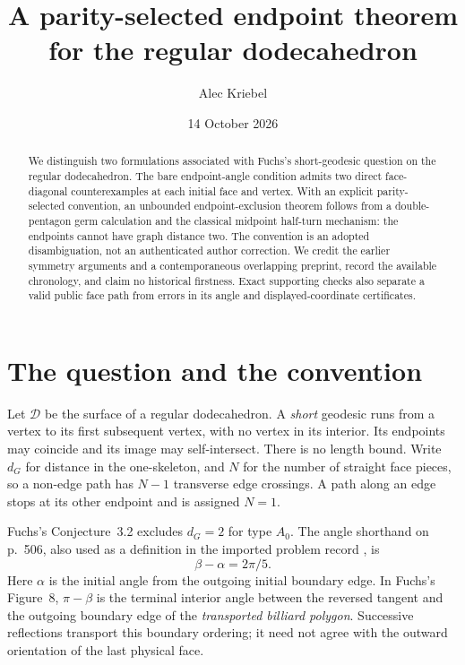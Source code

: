 \documentclass[11pt]{amsart}
\title[A dodecahedral endpoint theorem]{A parity-selected endpoint theorem for the regular dodecahedron}
\author{Alec Kriebel}
\date{14 October 2026}
\theoremstyle{remark}
\newcommand{\D}{\mathcal D}
\begin{document}
\begin{abstract}
We distinguish two formulations associated with Fuchs's short-geodesic question on the regular dodecahedron. The bare endpoint-angle condition admits two direct face-diagonal counterexamples at each initial face and vertex. With an explicit parity-selected convention, an unbounded endpoint-exclusion theorem follows from a double-pentagon germ calculation and the classical midpoint half-turn mechanism: the endpoints cannot have graph distance two. The convention is an adopted disambiguation, not an authenticated author correction. We credit the earlier symmetry arguments and a contemporaneous overlapping preprint, record the available chronology, and claim no historical firstness. Exact supporting checks also separate a valid public face path from errors in its angle and displayed-coordinate certificates.
\end{abstract}
\maketitle

\section{The question and the convention}
Let $\D$ be the surface of a regular dodecahedron. A \emph{short} geodesic runs from a vertex to its first subsequent vertex, with no vertex in its interior. Its endpoints may coincide and its image may self-intersect. There is no length bound. Write $d_G$ for distance in the one-skeleton, and $N$ for the number of straight face pieces, so a non-edge path has $N-1$ transverse edge crossings. A path along an edge stops at its other endpoint and is assigned $N=1$.

Fuchs's Conjecture~3.2 \cite[p.~515]{Fuchs} excludes $d_G=2$ for type $A_0$. The angle shorthand on p.~506, also used as a definition in the imported problem record \cite{Dataset}, is
\begin{equation}\label{bare}
                    \beta-\alpha=2\pi/5.
\end{equation}
Here $\alpha$ is the initial angle from the outgoing initial boundary edge. In Fuchs's Figure~8, $\pi-\beta$ is the terminal interior angle between the reversed tangent and the outgoing boundary edge of the \emph{transported billiard polygon}. Successive reflections transport this boundary ordering; it need not agree with the outward orientation of the last physical face.
\end{document}
